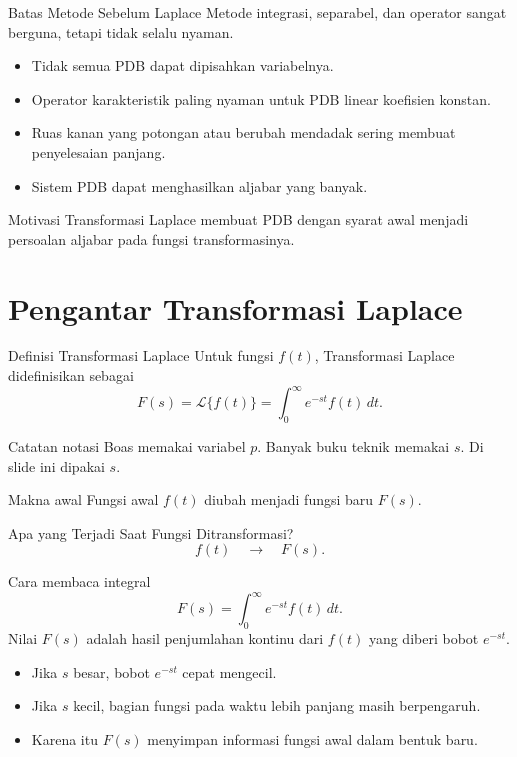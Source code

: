 \documentclass[aspectratio=169,11pt]{beamer}
\newcommand{\Lap}{\mathcal{L}}
\begin{document}
\begin{frame}{Batas Metode Sebelum Laplace}
Metode integrasi, separabel, dan operator sangat berguna, tetapi tidak selalu nyaman.
\begin{itemize}
  \item Tidak semua PDB dapat dipisahkan variabelnya.
  \item Operator karakteristik paling nyaman untuk PDB linear koefisien konstan.
  \item Ruas kanan yang potongan atau berubah mendadak sering membuat penyelesaian panjang.
  \item Sistem PDB dapat menghasilkan aljabar yang banyak.
\end{itemize}
\begin{block}{Motivasi}
Transformasi Laplace membuat PDB dengan syarat awal menjadi persoalan aljabar pada fungsi transformasinya.
\end{block}
\end{frame}

\section{Pengantar Transformasi Laplace}

\begin{frame}{Definisi Transformasi Laplace}
Untuk fungsi $f(t)$, Transformasi Laplace didefinisikan sebagai
\[
\boxed{F(s)=\Lap\{f(t)\}=\int_0^\infty e^{-st}f(t)\,dt.}
\]
\begin{block}{Catatan notasi}
Boas memakai variabel $p$. Banyak buku teknik memakai $s$. Di slide ini dipakai $s$.
\end{block}
\begin{alertblock}{Makna awal}
Fungsi awal $f(t)$ diubah menjadi fungsi baru $F(s)$.
\end{alertblock}
\end{frame}

\begin{frame}{Apa yang Terjadi Saat Fungsi Ditransformasi?}
\[
f(t) \quad \longrightarrow \quad F(s).
\]
\begin{block}{Cara membaca integral}
\[
F(s)=\int_0^\infty e^{-st}f(t)\,dt.
\]
Nilai $F(s)$ adalah hasil penjumlahan kontinu dari $f(t)$ yang diberi bobot $e^{-st}$.
\end{block}
\begin{itemize}
  \item Jika $s$ besar, bobot $e^{-st}$ cepat mengecil.
  \item Jika $s$ kecil, bagian fungsi pada waktu lebih panjang masih berpengaruh.
  \item Karena itu $F(s)$ menyimpan informasi fungsi awal dalam bentuk baru.
\end{itemize}
\end{frame}
\end{document}
